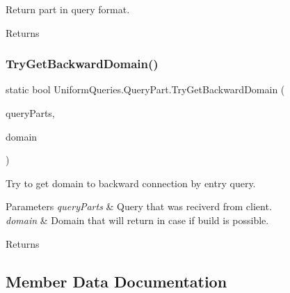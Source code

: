 Return part in query format. 

\begin{DoxyReturn}{Returns}

\end{DoxyReturn}
\mbox{\label{struct_uniform_queries_1_1_query_part_accd3b435809c426dd92456ffee0a996d}} 
\subsubsection{\texorpdfstring{Try\+Get\+Backward\+Domain()}{TryGetBackwardDomain()}}
{\footnotesize\ttfamily static bool Uniform\+Queries.\+Query\+Part.\+Try\+Get\+Backward\+Domain (\begin{DoxyParamCaption}\item[{\mbox{\hyperlink{struct_uniform_queries_1_1_query_part}{Query\+Part}} \mbox{[}$\,$\mbox{]}}]{query\+Parts,  }\item[{out string}]{domain }\end{DoxyParamCaption})\hspace{0.3cm}{\ttfamily [static]}}



Try to get domain to backward connection by entry query. 


\begin{DoxyParams}{Parameters}
{\em query\+Parts} & Query that was reciverd from client.\\
\hline
{\em domain} & Domain that will return in case if build is possible.\\
\hline
\end{DoxyParams}
\begin{DoxyReturn}{Returns}

\end{DoxyReturn}


\subsection{Member Data Documentation}
\mbox{\label{struct_uniform_queries_1_1_query_part_a24186fc4f67752331342e84554f806ff}} 
